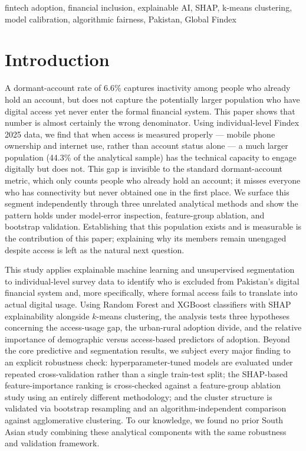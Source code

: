\documentclass[conference]{IEEEtran}
\begin{document}
\begin{IEEEkeywords}
fintech adoption, financial inclusion, explainable AI, SHAP, k-means
clustering, model calibration, algorithmic fairness, Pakistan, Global Findex
\end{IEEEkeywords}
 
\section{Introduction}
\label{sec:introduction}

A dormant-account rate of 6.6\% captures inactivity among people who already
hold an account, but does not capture the potentially larger population who
have digital access yet never enter the formal financial system. This paper shows that number
is almost certainly the wrong denominator. Using individual-level Findex
2025 data, we find that when access is measured properly --- mobile phone
ownership and internet use, rather than account status alone --- a much
larger population (44.3\% of the analytical sample) has the technical capacity to
engage digitally but does not. This gap is invisible to the standard
dormant-account metric, which only counts people who already hold an
account; it misses everyone who has connectivity but never obtained one in
the first place. We surface this segment independently through three unrelated analytical
methods and show the pattern holds under model-error inspection,
feature-group ablation, and bootstrap validation. Establishing that this
population exists and is measurable is the contribution of this paper;
explaining why its members remain unengaged despite access is left as
the natural next question.

This study applies explainable machine learning and unsupervised
segmentation to individual-level survey data to identify who is excluded
from Pakistan's digital financial system and, more specifically, where
formal access fails to translate into actual digital usage. Using Random
Forest and XGBoost classifiers with SHAP explainability alongside $k$-means
clustering, the analysis tests three hypotheses concerning the access-usage
gap, the urban-rural adoption divide, and the relative importance of
demographic versus access-based predictors of adoption. Beyond the core
predictive and segmentation results, we subject every major finding to an
explicit robustness check: hyperparameter-tuned models are evaluated under
repeated cross-validation rather than a single train-test split; the
SHAP-based feature-importance ranking is cross-checked against a feature-group ablation
study using an entirely different methodology; and the cluster structure is
validated via bootstrap resampling and an algorithm-independent comparison
against agglomerative clustering. To our knowledge, we found no prior South 
Asian study combining these analytical components with the same robustness and validation framework.
\end{document}
